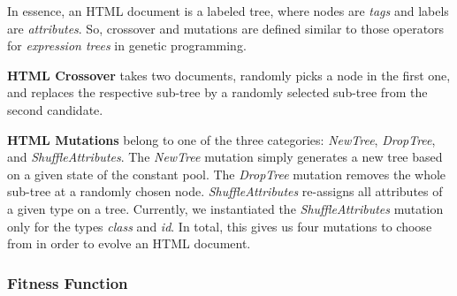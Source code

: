 In essence, an HTML document is a labeled tree, where nodes are \emph{tags} and labels are \emph{attributes}. So, crossover and mutations are defined similar to those operators for \emph{expression trees} in genetic programming.

\textbf{HTML Crossover} takes two documents, randomly picks a node in the first one, and replaces the respective sub-tree by a randomly selected sub-tree from the second candidate.

\textbf{HTML Mutations} belong to one of the three categories: \emph{NewTree}, \emph{DropTree}, and \emph{ShuffleAttributes}. The \emph{NewTree} mutation simply generates a new tree based on a given state of the constant pool. The \emph{DropTree} mutation removes the whole sub-tree at a randomly chosen node. \emph{ShuffleAttributes} re-assigns all attributes of a given type on a tree. Currently, we instantiated the \emph{ShuffleAttributes} mutation only for the types \emph{class} and \emph{id}. In total, this gives us four mutations to choose from in order to evolve an HTML document.

\subsubsection{Fitness Function}
\label{sub.sub.sec.fitness.fun}

